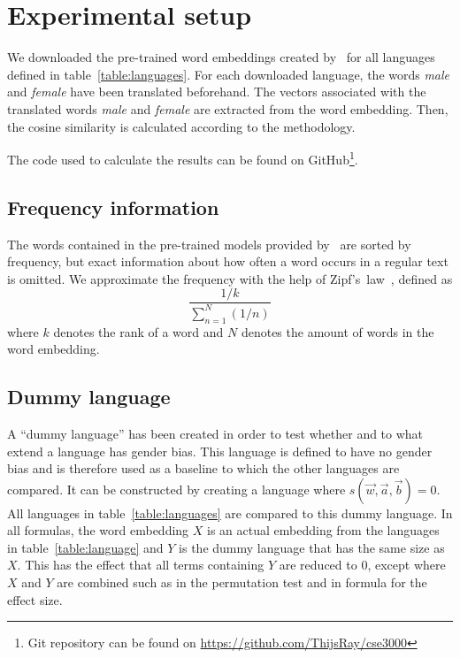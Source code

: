 \section{Experimental setup}
We downloaded the pre-trained word embeddings created
by~\textcite{grave2018learning} for all languages defined in table~\ref{table:languages}.
For each downloaded language, the words \textit{male} and \textit{female} have been
translated beforehand.
The vectors associated with the translated words \textit{male} and \textit{female} are
extracted from the word embedding. Then, the cosine similarity is calculated
according to the methodology.

The code used to calculate the results can be found on
GitHub\footnote{Git repository can be found on \url{https://github.com/ThijsRay/cse3000}}.

\subsection{Frequency information}
The words contained in the pre-trained models provided by~\textcite{grave2018learning}
are sorted by frequency, but exact information about how often a word occurs in
a regular text is omitted. We approximate the frequency with the help of
Zipf's~law~\parencite{Zipf-1935, word_embedding_zipf_context}, defined as 
\begin{equation}
    \frac{1/k}{\displaystyle\sum_{n=1}^{N}(1/n)}
\end{equation}
where $k$ denotes the rank of a word and
$N$ denotes the amount of words in the word embedding.

\subsection{Dummy language}
A ``dummy language'' has been created in order to test whether and to what extend a language has gender bias. This language is defined to have
no gender bias and is therefore used as a baseline to which the other languages
are compared.
It can be constructed by creating a language where $s(\vec{w}, \vec{a}, \vec{b}) = 0$.
All languages in table~\ref{table:languages} are compared to this
dummy language. In all formulas, the word embedding $X$ is an actual embedding from
the languages in table~\ref{table:language} and $Y$ is
the dummy language that has the same size as $X$. This has the effect that all terms
containing $Y$ are
reduced to $0$, except where $X$ and $Y$ are combined such as in the permutation test
and in formula for the effect size.


